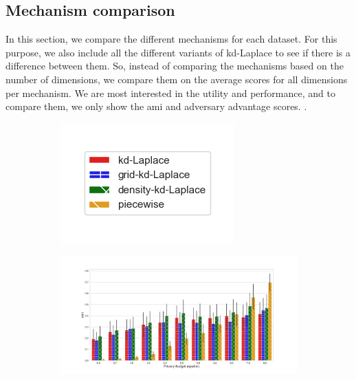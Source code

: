 \subsection{Mechanism comparison}
In this section, we compare the different mechanisms for each dataset.
For this purpose, we also include all the different variants of kd-Laplace to see if there is a difference between them.
So, instead of comparing the mechanisms based on the number of dimensions, we compare them on the average scores for all dimensions per mechanism.
We are most interested in the utility and performance, and to compare them, we only show the \gls{ami} and adversary advantage scores.
.
\begin{figure}[H]
  \centering
  \begin{subfigure}{0.30\textwidth}
    \includegraphics[width=\textwidth]{Results/kd-laplace/ami_bar_comparison_legend.png}
  \end{subfigure}
  \begin{subfigure}{1\textwidth}
    \includegraphics[width=1\textwidth]{Results/kd-laplace/ami_seeds-dataset_comparison.png}

\end{subfigure}
\end{figure}
